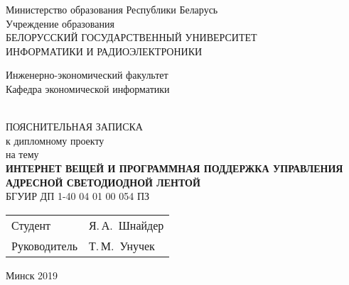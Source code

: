 \begin{titlepage}
  \begin{center}
    Министерство образования Республики Беларусь\\[1em]
    Учреждение образования\\
    БЕЛОРУССКИЙ ГОСУДАРСТВЕННЫЙ УНИВЕРСИТЕТ \\
    ИНФОРМАТИКИ И РАДИОЭЛЕКТРОНИКИ\\[1em]

    \begin{minipage}{\textwidth}
      \begin{flushleft}
          Инженерно-экономический факультет\\
          Кафедра экономической информатики\\
      \end{flushleft}
    \end{minipage}\\[3.5em]

    {ПОЯСНИТЕЛЬНАЯ ЗАПИСКА}\\
    {к дипломному проекту}\\
    {на тему}\\[3em]
    \textbf{\large\MakeUppercase{Интернет вещей и программная поддержка управления адресной светодиодной лентой}}\\[1em]


    {БГУИР ДП  1-40 04 01 00 054 ПЗ}\\[2em]
    
    \begin{tabular}{ p{}p{} }
      Студент & Я.\,А.~Шнайдер \\
      Руководитель & Т.\,М.~Унучек
    \end{tabular}
    
    \vfill
    {\normalsize Минск 2019}
  \end{center}
\end{titlepage}
